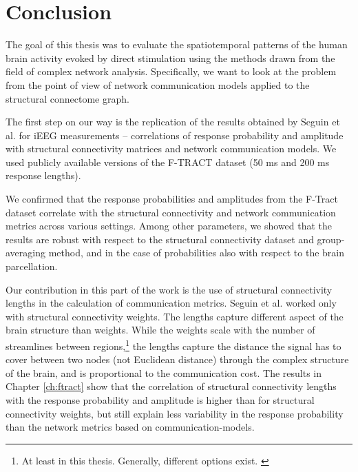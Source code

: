 \chapter*{Conclusion}

The goal of this thesis was to evaluate the spatiotemporal patterns of the human brain activity evoked by direct stimulation using the methods drawn from the field of complex network analysis. Specifically, we want to look at the problem from the point of view of network communication models applied to the structural connectome graph. 

The first step on our way is the replication of the results obtained by Seguin et al. \cite{seguin_communication_2023} for iEEG measurements -- correlations of response probability and amplitude with structural connectivity matrices and network communication models. We used publicly available versions of the F-TRACT dataset (50 ms and 200 ms response lengths).

We confirmed that the response probabilities and amplitudes from the F-Tract dataset correlate with the structural connectivity and network communication metrics across various settings. Among other parameters, we showed that the results are robust with respect to the structural connectivity dataset and group-averaging method, and in the case of probabilities also with respect to the brain parcellation. 

Our contribution in this part of the work is the use of structural connectivity lengths in the calculation of communication metrics. Seguin et al. \cite{seguin_communication_2023} worked only with structural connectivity weights. The lengths capture different aspect of the brain structure than weights. While the weights scale with the number of streamlines between regions,\footnote{At least in this thesis. Generally, different options exist. \cite{zhang_quantitative_2022}} the lengths capture the distance the signal has to cover between two nodes (not Euclidean distance) through the complex structure of the brain, and is proportional to the communication cost. The results in Chapter \ref{ch:ftract} show that the correlation of structural connectivity lengths with the response probability and amplitude is higher than for structural connectivity weights, but still explain less variability in the response probability than the network metrics based on communication-models.


